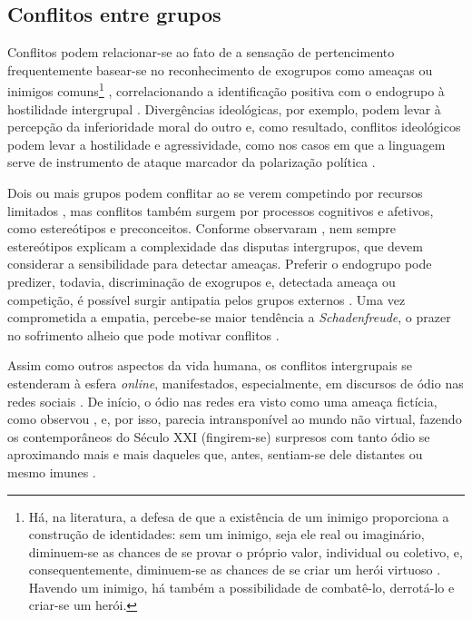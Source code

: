 \documentclass[portuguese]{textolivre}
\begin{document}
\subsection{Conflitos entre grupos}

Conflitos podem relacionar-se ao fato de a sensação de pertencimento frequentemente basear-se no reconhecimento de exogrupos como ameaças ou inimigos comuns\footnote{Há, na literatura, a defesa de que a existência de um inimigo proporciona a construção de identidades: sem um inimigo, seja ele real ou imaginário, diminuem-se as chances de se provar o próprio valor, individual ou coletivo, e, consequentemente, diminuem-se as chances de se criar um herói virtuoso \cite{eco2021construir, eco2022}. Havendo um inimigo, há também a possibilidade de combatê-lo, derrotá-lo e criar-se um herói.} \cite{tajfel1974social}, correlacionando a identificação positiva com o endogrupo à hostilidade intergrupal \cite{dovidio2020}. Divergências ideológicas, por exemplo, podem levar à percepção da inferioridade moral do outro e, como resultado, conflitos ideológicos podem levar a hostilidade e agressividade, como nos casos em que a linguagem serve de instrumento de ataque marcador da polarização política \cite{bilewicz2020hate}.

Dois ou mais grupos podem conflitar ao se verem competindo por recursos limitados \cite{sherif1988robbers}, mas conflitos também surgem por processos cognitivos e afetivos, como estereótipos e preconceitos. Conforme observaram \textcite{cikara2022hate}, nem sempre estereótipos explicam a complexidade das disputas intergrupos, que devem considerar a sensibilidade para detectar ameaças. Preferir o endogrupo pode predizer, todavia, discriminação de exogrupos \cite{hewstone2002intergroup} e, detectada ameaça ou competição, é possível surgir antipatia pelos grupos externos \cite{brewer2016intergroup}. Uma vez comprometida a empatia, percebe-se maior tendência a \textit{Schadenfreude}, o prazer no sofrimento alheio que pode motivar conflitos \cite{cikara2014their, cikara2011us}.

Assim como outros aspectos da vida humana, os conflitos intergrupais se estenderam à esfera \textit{online}, manifestados, especialmente, em discursos de ódio nas redes sociais \cite{kaczmarczyk2019online}. De início, o ódio nas redes era visto como uma ameaça fictícia, como observou \textcite{cattani2020}, e, por isso, parecia intransponível ao mundo não virtual, fazendo os contemporâneos do Século XXI (fingirem-se) surpresos com tanto ódio se aproximando mais e mais daqueles que, antes, sentiam-se dele distantes ou mesmo imunes \cite{glucksmann2007}.
\end{document}
